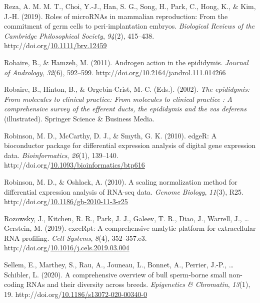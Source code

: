 \documentclass[12pt,twoside]{reedthesis}
\newlength{\cslhangindent}
\newenvironment{CSLReferences}[2] %
 {%
  \setlength{\parindent}{0pt}
  \ifodd #1 \everypar{\setlength{\hangindent}{\cslhangindent}}\ignorespaces\fi
  \ifnum #2 > 0
  \setlength{\parskip}{#2\baselineskip}
  \fi
 }%
 {}
\begin{document}
\begin{CSLReferences}{1}{0}
\leavevmode{}%
Reza, A. M. M. T., Choi, Y.-J., Han, S. G., Song, H., Park, C., Hong, K., \& Kim, J.-H. (2019). Roles of {microRNAs} in mammalian reproduction: From the commitment of germ cells to peri-implantation embryos. \emph{Biological Reviews of the Cambridge Philosophical Society}, \emph{94}(2), 415--438. http://doi.org/\href{https://doi.org/10.1111/brv.12459}{10.1111/brv.12459}

\leavevmode{}%
Robaire, B., \& Hamzeh, M. (2011). Androgen action in the epididymis. \emph{Journal of Andrology}, \emph{32}(6), 592--599. http://doi.org/\href{https://doi.org/10.2164/jandrol.111.014266}{10.2164/jandrol.111.014266}

\leavevmode{}%
Robaire, B., Hinton, B., \& Orgebin-Crist, M.-C. (Eds.). (2002). \emph{The epididymis: From molecules to clinical practice: From molecules to clinical practice : A comprehensive survey of the efferent ducts, the epididymis and the vas deferens} (illustrated). Springer Science \& Business Media.

\leavevmode{}%
Robinson, M. D., McCarthy, D. J., \& Smyth, G. K. (2010). {edgeR}: A bioconductor package for differential expression analysis of digital gene expression data. \emph{Bioinformatics}, \emph{26}(1), 139--140. http://doi.org/\href{https://doi.org/10.1093/bioinformatics/btp616}{10.1093/bioinformatics/btp616}

\leavevmode{}%
Robinson, M. D., \& Oshlack, A. (2010). A scaling normalization method for differential expression analysis of {RNA}-seq data. \emph{Genome Biology}, \emph{11}(3), R25. http://doi.org/\href{https://doi.org/10.1186/gb-2010-11-3-r25}{10.1186/gb-2010-11-3-r25}

\leavevmode{}%
Rozowsky, J., Kitchen, R. R., Park, J. J., Galeev, T. R., Diao, J., Warrell, J., \ldots{} Gerstein, M. (2019). {exceRpt}: A comprehensive analytic platform for extracellular {RNA} profiling. \emph{Cell Systems}, \emph{8}(4), 352--357.e3. http://doi.org/\href{https://doi.org/10.1016/j.cels.2019.03.004}{10.1016/j.cels.2019.03.004}

\leavevmode{}%
Sellem, E., Marthey, S., Rau, A., Jouneau, L., Bonnet, A., Perrier, J.-P., \ldots{} Schibler, L. (2020). A comprehensive overview of bull sperm-borne small non-coding {RNAs} and their diversity across breeds. \emph{Epigenetics \& Chromatin}, \emph{13}(1), 19. http://doi.org/\href{https://doi.org/10.1186/s13072-020-00340-0}{10.1186/s13072-020-00340-0}


\end{CSLReferences}
\end{document}
